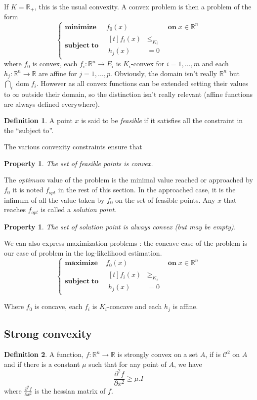 \documentclass[10pt]{report}
\theoremstyle{plain}
\newtheorem{prop}[thm]{Property}
\theoremstyle{definition}
\newtheorem{defn}{Definition}[chapter]
\theoremstyle{remark}
\newcommand{\R}{\ensuremath{\mathbb{R}}}
\newcommand{\dparn}[3]{\frac{\partial^{#3} {#1}}{\partial{#2}^{#3}}}
\renewcommand{\geq}{\geqslant}
\renewcommand{\leq}{\leqslant}
\DeclareMathOperator{\dom}{dom}
\newcommand{\class}[1]{{\mathscr{C}^{#1}}}
\newcommand{\maxima}[3]{\begin{cases}
    \mathbf{maximize}\,\quad #1& \mathbf{on}\; #2\\
    \mathbf{subject\;to}\quad \begin{aligned}[t]#3\end{aligned}
  \end{cases}}
\newcommand{\minima}[3]{\begin{cases}
    \mathbf{minimize}\;\,\quad #1& \mathbf{on}\; #2\\
    \mathbf{subject\;to}\quad \begin{aligned}[t]#3\end{aligned}
  \end{cases}}
\begin{document}
If $K = \R_+$, this is the usual convexity. A convex problem is then a problem
of the form
\begin{equation}\label{eqn:stdprb}
\minima{f_0(x)}{x \in \R^n}{f_i(x) &\leq_{K_i} \\ \!\!h_j(x) &= 0}
\end{equation}
where $f_0$ is convex, each $f_i : \R^n \to E_i$ is $K_i$-convex for $i = 1,\ldots,m$ and each
$h_j : \R^n \to \R$ are affine for $j = 1,\ldots,p$. Obviously, the domain isn't really $\R^n$
but $\bigcap_i \dom f_i$. However as all convex
functions can be extended setting their values to $\infty$ outside their domain,
so the distinction isn't really relevant (affine functions are always defined
everywhere).

\begin{defn}
  A point $x$ is said to be \emph{feasible} if it satisfies all the constraint
  in the ``subject to''.
\end{defn}

The various convexity constraints ensure that

\begin{prop}
  The set of feasible points is convex.
\end{prop}

The \emph{optimum} value of the problem is the minimal value reached or approached by $f_0$ it
is noted $f_{opt}$ in the rest of this section. In the approached case, it is the
infimum of all the value taken by $f_0$ on the set of feasible points.
Any $x$ that reaches $f_{opt}$ is called a \emph{solution point}.

\begin{prop}
  The set of solution point is always convex (but may be empty).
\end{prop}

We can also express maximization problems : the concave case of the problem is
our case of problem in the log-likelihood estimation.
\[\maxima{f_0(x)}{x \in \R^n}{f_i(x) &\geq_{K_i}\\\!h_j(x)&=0}\]

Where $f_0$ is concave, each $f_i$ is $K_i$-concave and each $h_j$ is affine.

\subsection{Strong convexity}

\begin{defn}
  A function, $f : \R^n \to \R$ is strongly convex on a set $A$, if is $\class
  2$ on $A$ and if there is a constant $\mu$ such that
  for any point of $A$, we have
  \[\dparn f x 2 \geq \mu.I\]
  where $\dparn f x 2$ is the hessian matrix of $f$.
\end{defn}
\end{document}
